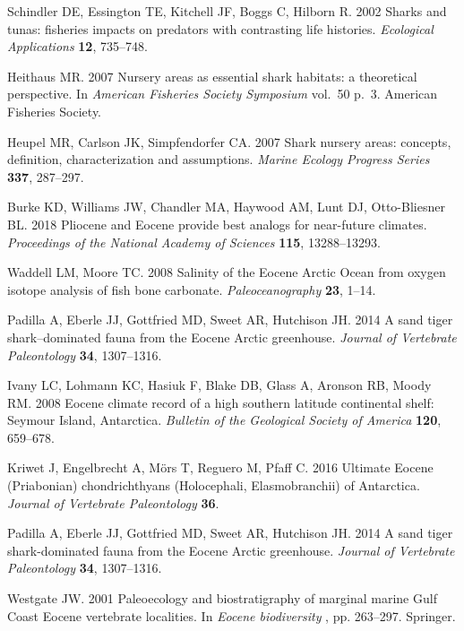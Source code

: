 \documentclass[]{rsos}%
\begin{document}
\begin{thebibliography}{99}
Schindler DE, Essington TE, Kitchell JF, Boggs C, Hilborn R. 2002  Sharks and
  tunas: fisheries impacts on predators with contrasting life histories. {\em
  Ecological Applications} \textbf{12}, 735--748.

Heithaus MR. 2007  Nursery areas as essential shark habitats: a theoretical
  perspective. In {\em American Fisheries Society Symposium} vol.~50 p.~3.
  American Fisheries Society.

Heupel MR, Carlson JK, Simpfendorfer CA. 2007  Shark nursery areas: concepts,
  definition, characterization and assumptions. {\em Marine Ecology Progress
  Series} \textbf{337}, 287--297.

Burke KD, Williams JW, Chandler MA, Haywood AM, Lunt DJ, Otto-Bliesner BL. 2018
   Pliocene and Eocene provide best analogs for near-future climates. {\em
  Proceedings of the National Academy of Sciences} \textbf{115}, 13288--13293.

Waddell LM, Moore TC. 2008  {Salinity of the Eocene Arctic Ocean from oxygen
  isotope analysis of fish bone carbonate}. {\em Paleoceanography} \textbf{23},
  1--14.

Padilla A, Eberle JJ, Gottfried MD, Sweet AR, Hutchison JH. 2014  A sand tiger
  shark--dominated fauna from the Eocene Arctic greenhouse. {\em Journal of
  Vertebrate Paleontology} \textbf{34}, 1307--1316.

Ivany LC, Lohmann KC, Hasiuk F, Blake DB, Glass A, Aronson RB, Moody RM. 2008
  {Eocene climate record of a high southern latitude continental shelf: Seymour
  Island, Antarctica}. {\em Bulletin of the Geological Society of America}
  \textbf{120}, 659--678.

Kriwet J, Engelbrecht A, M{\"{o}}rs T, Reguero M, Pfaff C. 2016  {Ultimate
  Eocene (Priabonian) chondrichthyans (Holocephali, Elasmobranchii) of
  Antarctica}. {\em Journal of Vertebrate Paleontology} \textbf{36}.

Padilla A, Eberle JJ, Gottfried MD, Sweet AR, Hutchison JH. 2014  {A sand tiger
  shark-dominated fauna from the Eocene Arctic greenhouse}. {\em Journal of
  Vertebrate Paleontology} \textbf{34}, 1307--1316.

Westgate JW. 2001  Paleoecology and biostratigraphy of marginal marine Gulf
  Coast Eocene vertebrate localities. In {\em Eocene biodiversity} ,  pp.
  263--297. Springer.


\end{thebibliography}
\end{document}
